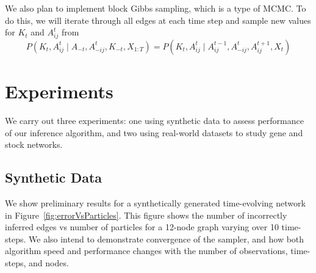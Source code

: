 \documentclass{article}
\begin{document}
We also plan to implement block Gibbs sampling, which is a type of MCMC. To do this, we will iterate through all edges at each time step and sample new values for $K_t$ and $A_{ij}^t$ from $$P(K_t,A_{ij}^t \mid A_{-t}, A_{-ij}^t, K_{-t}, X_{1:T}) = P(K_t,A_{ij}^t \mid A_{ij}^{t-1}, A_{-ij}^t, A_{ij}^{t+1}, X_t)$$


\section{Experiments}
\label{sec:exp}

We carry out three experiments: one using synthetic data to assess performance of our inference algorithm, and two using real-world datasets to study gene and stock networks.

\subsection{Synthetic Data}
We show preliminary results for a synthetically generated time-evolving network in Figure~\ref{fig:errorVsParticles}. This figure shows the number of incorrectly inferred edges vs number of particles for a 12-node graph varying over 10 time-steps. We also intend to demonstrate convergence of the sampler, and how both algorithm speed and performance changes with the number of observations, time-steps, and nodes.
\end{document}
